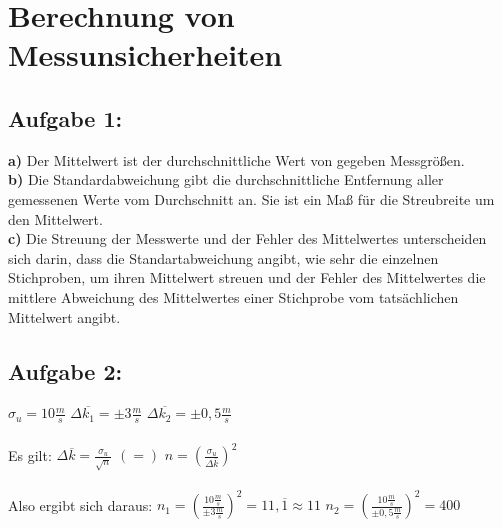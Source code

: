 \documentclass[a4paper]{scrartcl}
\begin{document}
\section*{Berechnung von Messunsicherheiten}

\subsection*{Aufgabe 1:}
\textbf{a)} Der Mittelwert ist der durchschnittliche Wert von gegeben Messgrößen.
\\ \textbf{b)} Die Standardabweichung gibt die durchschnittliche Entfernung aller gemessenen Werte vom Durchschnitt an. Sie ist ein Maß für die Streubreite um den Mittelwert.
\\ \textbf{c)} Die Streuung der Messwerte und der Fehler des Mittelwertes unterscheiden sich darin, dass die Standartabweichung angibt, wie sehr die einzelnen Stichproben, um ihren Mittelwert streuen und der Fehler des Mittelwertes die mittlere Abweichung des Mittelwertes einer Stichprobe vom tatsächlichen Mittelwert angibt.

\subsection*{Aufgabe 2:}
$\sigma_u=10\frac{m}{s}$\qquad
$\Delta\overline{k_1}=\pm3\frac{m}{s}$\qquad
$\Delta\overline{k_2}=\pm0,5\frac{m}{s}$\\
\\Es gilt:\qquad
$\Delta\overline{k}=\frac{\sigma_u}{\sqrt{n}}$\qquad
$(=)$\qquad
$n=(\frac{\sigma_u}{\Delta\overline{k}})^{2}$\\
\\Also ergibt sich daraus:\qquad
$n_1=(\frac{10\frac{m}{s}}{\pm3\frac{m}{s}})^{2}=11,\overline{1}\approx11$\qquad
$n_2=(\frac{10\frac{m}{s}}{\pm0,5\frac{m}{s}})^{2}=400$
\end{document}
